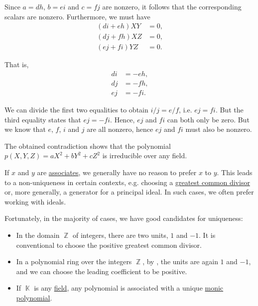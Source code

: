 \begin{example}
\begin{thmenum}
    Since \( a = dh \), \( b = ei \) and \( c = fj \) are nonzero, it follows that the corresponding scalars are nonzero. Furthermore, we must have
    \begin{align*}
      (d i + e h) X Y &= 0, \\
      (d j + f h) X Z &= 0, \\
      (e j + f i) Y Z &= 0.
    \end{align*}

    That is,
    \begin{align*}
      d i &= - e h, \\
      d j &= - f h, \\
      e j &= - f i.
    \end{align*}

    We can divide the first two equalities to obtain \( i / j = e / f \), i.e. \( ej = fi \). But the third equality states that \( ej = -fi \). Hence, \( ej \) and \( fi \) can both only be zero. But we know that \( e \), \( f \), \( i \) and \( j \) are all nonzero, hence \( ej \) and \( fi \) must also be nonzero.

    The obtained contradiction shows that the polynomial \( p(X, Y, Z) = a X^2 + b Y^2 + c Z^2 \) is irreducible over any field.
  \end{thmenum}
\end{example}

\begin{remark}\label{rem:choice_of_associates}
  If \( x \) and \( y \) are \hyperref[def:domain_divisibility/associates]{associates}, we generally have no reason to prefer \( x \) to \( y \). This leads to a non-uniqueness in certain contexts, e.g. choosing a \hyperref[def:gcd_and_lcm]{greatest common divisor} or, more generally, a generator for a principal ideal. In such cases, we often prefer working with ideals.

  Fortunately, in the majority of cases, we have good candidates for uniqueness:
  \begin{itemize}
    \item In the domain \( \BbbZ \) of integers, there are two units, \( 1 \) and \( -1 \). It is conventional to choose the positive greatest common divisor.

    \item In a polynomial ring over the integers \( \BbbZ \), by , the units are again \( 1 \) and \( -1 \), and we can choose the leading coefficient to be positive.

    \item If \( \BbbK \) is any \hyperref[def:field]{field}, any polynomial is associated with a unique \hyperref[def:monic_polynomial]{monic polynomial}.
  \end{itemize}
\end{remark}

